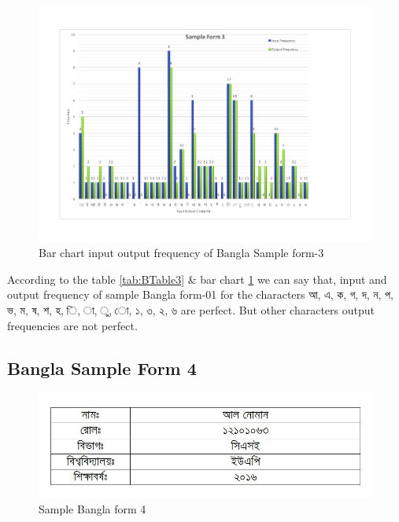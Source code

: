 \begin{figure}[H]
\centering
\includegraphics[width=1\textwidth]{Bform3.pdf}
\caption {Bar chart input output frequency of Bangla Sample form-3}
\label {fig:Bbar3}
\end{figure}

According to the table \ref{tab:BTable3} \& bar chart \ref{fig:Bbar3} we can say that, input and output frequency of sample Bangla form-01 for the characters {\bengalifont আ,  এ, ক, গ, দ, ন, প, ভ, ম, ষ, শ, হ, ি, া, ু, ো, ১, ৩, ২, ৬  }are perfect. But other characters output frequencies are not perfect.

\subsection{Bangla Sample Form 4}
\begin{figure}[H]
\centering
\includegraphics[width=1\textwidth]{formBen04.JPG}
\caption {Sample Bangla form 4}
\label {fig:FormBan4}
\end{figure}

